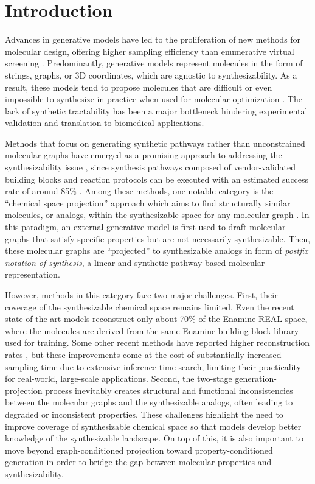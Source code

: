 \section{Introduction}
\label{sec:intro}

Advances in generative models have led to the proliferation of new methods for molecular design, offering higher sampling efficiency than enumerative virtual screening \citep{gomez2018automatic,gao2022sample}. 
Predominantly, generative models represent molecules in the form of strings, graphs, or 3D coordinates, which are agnostic to synthesizability.
As a result, these models tend to propose molecules that are difficult or even impossible to synthesize in practice when used for molecular optimization \citep{gao2020synthesizability}.
The lack of synthetic tractability has been a major bottleneck hindering experimental validation and translation to biomedical applications. 

Methods that focus on generating synthetic pathways rather than unconstrained molecular graphs have emerged as a promising approach to addressing the synthesizability issue \citep{gao2021amortized,swanson2024synthemol,horwood2020reactor,cretu2024synflownet}, since synthesis pathways composed of vendor-validated building blocks and reaction protocols can be executed with an estimated success rate of around 85\% \citep{grygorenko2020generating}.
Among these methods, one notable category is the ``chemical space projection'' approach which aims to find structurally similar molecules, or analogs, within the synthesizable space for any molecular graph \citep{luo2024projecting}.
In this paradigm, an external generative model is first used to draft molecular graphs that satisfy specific properties but are not necessarily synthesizable. Then, these molecular graphs are ``projected'' to synthesizable analogs in form of \textit{postfix notation of synthesis}, a linear and synthetic pathway-based molecular representation.

However, methods in this category face two major challenges.
First, their coverage of the synthesizable chemical space remains limited.
Even the recent state-of-the-art models \citep{gao2025generative,sun2025synllama} reconstruct only about 70\% of the Enamine REAL space, where the molecules are derived from the same Enamine building block library used for training.
Some other recent methods have reported higher reconstruction rates \citep{lee2025rethinking}, but these improvements come at the cost of substantially increased sampling time due to extensive inference-time search, limiting their practicality for real-world, large-scale applications.
Second, the two-stage generation-projection process inevitably creates structural and functional inconsistencies between the molecular graphs and the synthesizable analogs, often leading to degraded or inconsistent properties.
These challenges highlight the need to improve coverage of synthesizable chemical space so that models develop better knowledge of the synthesizable landscape. 
On top of this, it is also important to move beyond graph-conditioned projection toward property-conditioned generation in order to bridge the gap between molecular properties and synthesizability.


